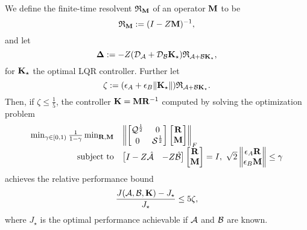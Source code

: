 \documentclass[11pt]{article}
\numberwithin{equation}{section}
\begin{document}
We define the finite-time resolvent $\mathfrak{R}_{\mathbf{M}}$ of an operator $\mathbf{M}$ to be
\begin{equation}
\mathfrak{R}_{\mathbf{M}} := (I - Z\mathbf{M})^{-1},
\end{equation}
and let 
\begin{equation}
\mathbf{\Delta} := - Z(\mathcal{D}_{\mathcal{A}} + \mathcal{D}_{\mathcal{B}} \mathbf{K}_\star)\mathfrak{R}_{\mathcal{A} + \mathcal{B}\mathbf{K}_\star},
\end{equation}
for $\mathbf{K}_\star$ the optimal LQR controller.  Further let 
\begin{equation}
\zeta := (\epsilon_A + \epsilon_B \| \mathbf{K}_\star\|)\mathfrak{R}_{\mathcal{A} + \mathcal{B}\mathbf{K}_\star}.
\end{equation}
Then, if $\zeta \leq \frac{1}{5}$, the controller $\mathbf{K}=\mathbf{M} \mathbf{R}^{-1}$ computed by solving the optimization problem
\begin{equation}
\begin{array}{rl}
\min_{\gamma \in [0,1)} \frac{1}{1-\gamma} \min_{\tf R, \tf M} & \bignorm{\begin{bmatrix} \Qq^{\frac{1}{2}} & 0 \\ 0 & \Ss^{\frac{1}{2}}\end{bmatrix}\begin{bmatrix}\tf R \\ \tf M\end{bmatrix}}_F \\
\st & \begin{bmatrix} I - Z\Ahh & -Z\Bhh \end{bmatrix}\begin{bmatrix} \tf R \\ \tf M \end{bmatrix} = I, \ \sqrt{2}\bignorm{\begin{matrix} \epsilon_A\tf R \\ \epsilon_B\tf M\end{matrix}} \leq \gamma
\end{array}
\end{equation}
achieves the relative performance bound
\begin{equation}
\frac{J(\mathcal{A},\mathcal{B},\mathbf{K}) - J_\star}{J_\star} \leq 5 \zeta,
\end{equation}
where $J_\star$ is the optimal performance achievable if $\mathcal{A}$ and $\mathcal{B}$ are known.
\end{document}
